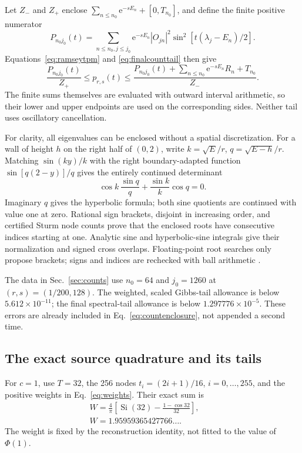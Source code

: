 \documentclass[aps,pra,reprint,superscriptaddress,longbibliography]{revtex4-2}
\newcommand{\ee}{\mathrm e}
\begin{document}
Let $Z_-$ and $Z_+$ enclose
$\sum_{n\le n_0}\ee^{-sE_n}+[0,T_{n_0}]$, and define the finite
positive numerator
\begin{equation}
 P_{n_0j_0}(t)=\sum_{n\le n_0,j\le j_0}\ee^{-sE_n}|O_{jn}|^2
                         \sin^2[t(\lambda_j-E_n)/2].
\end{equation}
Equations~\eqref{eq:ramseytpm} and \eqref{eq:finalcounttail} then give
\begin{equation}
 \frac{P_{n_0j_0}(t)}{Z_+}\le p_{r,s}(t)
 \le\frac{P_{n_0j_0}(t)+\sum_{n\le n_0}\ee^{-sE_n}R_n+T_{n_0}}
              {Z_-}.                                         \label{eq:countenclosure}
\end{equation}
The finite sums themselves are evaluated with outward interval
arithmetic, so their lower and upper endpoints are used on the
corresponding sides. Neither tail uses oscillatory cancellation.

For clarity, all eigenvalues can be enclosed without a spatial
discretization. For a wall of height $h$ on the right half of $(0,2)$,
write $k=\sqrt E/r$, $q=\sqrt{E-h}/r$. Matching $\sin(ky)/k$ with
the right boundary-adapted function $\sin[q(2-y)]/q$ gives the
entirely continued determinant
\begin{equation}
       \cos k\,\frac{\sin q}{q}+\frac{\sin k}{k}\cos q=0.      \label{eq:countdet}
\end{equation}
Imaginary $q$ gives the hyperbolic formula; both sine quotients are
continued with value one at zero. Rational sign brackets, disjoint in increasing order, and
certified Sturm node counts prove that the enclosed roots have
consecutive indices starting at one. Analytic sine and hyperbolic-sine
integrals give their normalization and signed cross overlaps.
Floating-point root searches only propose brackets; signs and
indices are rechecked with ball arithmetic \cite{JohanssonArb}.

The data in Sec.~\ref{sec:counts} use $n_0=64$ and $j_0=1260$ at
$(r,s)=(1/200,128)$. The weighted, scaled Gibbs-tail allowance is
below $5.612\times10^{-11}$; the final spectral-tail allowance is
below $1.297776\times10^{-5}$. These errors are already included
in Eq.~\eqref{eq:countenclosure}, not appended a second time.

\subsection{The exact source quadrature and its tails}

For $c=1$, use $T=32$, the 256 nodes $t_i=(2i+1)/16$,
$i=0,\ldots,255$, and the positive weights in Eq.~\eqref{eq:weights}.
Their exact sum is
\begin{equation}
 \begin{gathered}
 W=\frac4\pi\left[\operatorname{Si}(32)
                       -\frac{1-\cos32}{32}\right],
 \qquad\\ W=1.95959365427766\ldots .                            \label{eq:weighttotal}
 \end{gathered}
\end{equation}
The weight is fixed by the reconstruction identity, not fitted to
the value of $\Phi(1)$.
\end{document}
